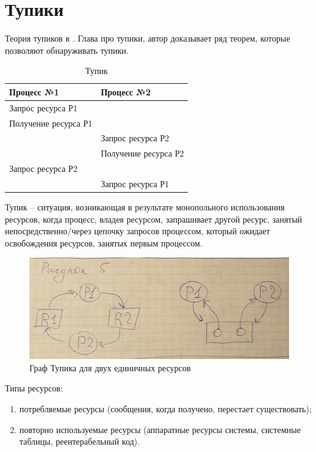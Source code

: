 \section{Тупики}

Теория тупиков в \cite{Show_Logic_os}. Глава про тупики, автор доказывает ряд теорем, которые позволяют обнаруживать тупики.

\begin{table}[H]
\caption{Тупик}
\begin{tabular}{|l|l|}
\hline
Процесс №1 & Процесс №2 \\
\hline
Запрос ресурса Р1 & \\
Получение ресурса Р1 & \\
\hline
 & Запрос ресурса Р2\\
 & Получение ресурса Р2\\
\hline
Запрос ресурса Р2 & \\
\hline
 & Запрос ресурса Р1\\
\end{tabular}
\end{table}

Тупик – ситуация, возникающая в результате монопольного использования ресурсов, когда процесс, владея ресурсом, запрашивает другой ресурс, занятый непосредственно/через цепочку запросов процессом, который ожидает освобождения ресурсов, занятых первым процессом.

\begin{figure}[H]
    \centering
    \includegraphics[width=\textwidth]{pic/5.png}
    \caption{Граф Тупика для двух единичных ресурсов}
\end{figure}

Типы ресурсов:
\begin{enumerate}
    \item потребляемые ресурсы (сообщения, когда получено, перестает существовать);
    \item повторно используемые ресурсы (аппаратные ресурсы системы, системные таблицы, реентерабельный код).
\end{enumerate} 

